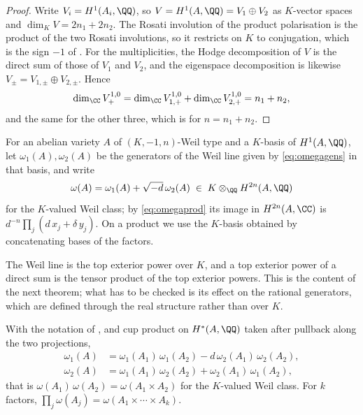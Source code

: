 \begin{proof}
Write $V_{i}=H^{1}(A_{i},\QQ)$, so $V=H^{1}(A,\QQ)=V_{1}\oplus V_{2}$ as
$K$-vector spaces and $\dim_{K}V=2n_{1}+2n_{2}$. The Rosati involution of the
product polarisation is the product of the two Rosati involutions, so it
restricts on $K$ to conjugation, which is the sign $-1$ of
. For the multiplicities, the Hodge decomposition of $V$ is
the direct sum of those of $V_{1}$ and $V_{2}$, and the eigenspace
decomposition is likewise $V_{\pm}=V_{1,\pm}\oplus V_{2,\pm}$. Hence
\[
  \dim_{\CC}V_{+}^{1,0}
  =\dim_{\CC}V_{1,+}^{1,0}+\dim_{\CC}V_{2,+}^{1,0}
  =n_{1}+n_{2},
\]
and the same for the other three, which is  for
$n=n_{1}+n_{2}$.
\end{proof}

For an abelian variety $A$ of $(K,-1,n)$-Weil type and a $K$-basis of
$H^{1}(A,\QQ)$, let $\omega_{1}(A),\omega_{2}(A)$ be the generators of the
Weil line given by \eqref{eq:omegagens} in that basis, and write
\[
  \omega(A)=\omega_{1}(A)+\sqrt{-d}\,\omega_{2}(A)\;\in\;
  K\otimes_{\QQ}H^{2n}(A,\QQ)
\]
for the $K$-valued Weil class; by \eqref{eq:omegaprod} its image in
$H^{2n}(A,\CC)$ is $d^{-n}\prod_{j}(d\,x_{j}+\delta\,y_{j})$. On a product we
use the $K$-basis obtained by concatenating bases of the factors.

The Weil line is the top exterior power over $K$, and a top exterior power of
a direct sum is the tensor product of the top exterior powers. This is the
content of the next theorem; what has to be checked is its effect on the
rational generators, which are defined through the real structure rather
than over $K$.

\begin{theorem}\label{thm:weilmult}
With the notation of , and cup product on
$H^{*}(A,\QQ)$ taken after pullback along the two projections,
\begin{equation}\label{eq:weilmult}
\begin{aligned}
  \omega_{1}(A)&=\omega_{1}(A_{1})\,\omega_{1}(A_{2})
    -d\,\omega_{2}(A_{1})\,\omega_{2}(A_{2}),\\
  \omega_{2}(A)&=\omega_{1}(A_{1})\,\omega_{2}(A_{2})
    +\omega_{2}(A_{1})\,\omega_{1}(A_{2}),
\end{aligned}
\end{equation}
that is $\omega(A_{1})\,\omega(A_{2})=\omega(A_{1}\times A_{2})$ for the
$K$-valued Weil class. For $k$ factors,
$\prod_{j}\omega(A_{j})=\omega(A_{1}\times\cdots\times A_{k})$.
\end{theorem}

